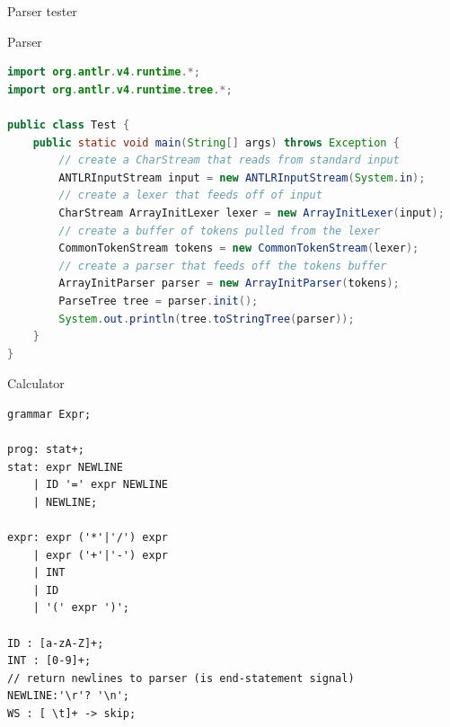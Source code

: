 \documentclass{beamer}
\begin{document}
\begin{frame}[fragile]{Parser tester}
	\begin{exampleblock}{Parser}
		\begin{lstlisting}[basicstyle=\tiny, language=Java]
import org.antlr.v4.runtime.*;
import org.antlr.v4.runtime.tree.*;
			
public class Test { 
    public static void main(String[] args) throws Exception { 
        // create a CharStream that reads from standard input 
        ANTLRInputStream input = new ANTLRInputStream(System.in);
        // create a lexer that feeds off of input 
        CharStream ArrayInitLexer lexer = new ArrayInitLexer(input);
        // create a buffer of tokens pulled from the lexer 
        CommonTokenStream tokens = new CommonTokenStream(lexer);
        // create a parser that feeds off the tokens buffer 
        ArrayInitParser parser = new ArrayInitParser(tokens);
        ParseTree tree = parser.init();
        System.out.println(tree.toStringTree(parser));
    } 
}			
		\end{lstlisting}
	\end{exampleblock}
\end{frame}

\begin{frame}[fragile]{Calculator}
\begin{lstlisting}[style=ANTLR]
grammar Expr;

prog: stat+;
stat: expr NEWLINE
    | ID '=' expr NEWLINE
    | NEWLINE;

expr: expr ('*'|'/') expr
    | expr ('+'|'-') expr
    | INT
    | ID
    | '(' expr ')';

ID : [a-zA-Z]+;
INT : [0-9]+;
// return newlines to parser (is end-statement signal)
NEWLINE:'\r'? '\n';
WS : [ \t]+ -> skip;
\end{lstlisting}
\end{frame}




\end{document}
